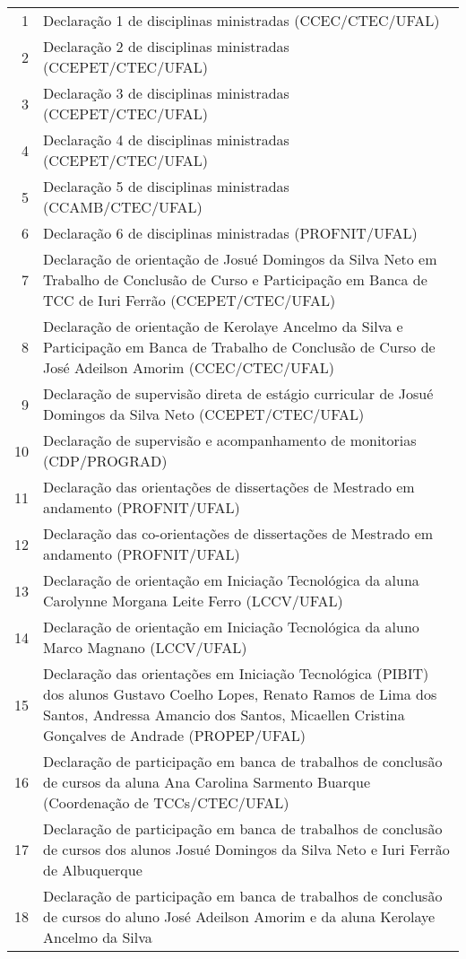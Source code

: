 \documentclass[a4paper,oneside,10pt]{article}
\begin{document}
{\begin{longtable}[H]{@{} r P{8cm} @{}}
1  & {Declaração 1 de disciplinas ministradas (CCEC/CTEC/UFAL)}\\
2  & {Declaração 2 de disciplinas ministradas (CCEPET/CTEC/UFAL)}\\
3  & {Declaração 3 de disciplinas ministradas (CCEPET/CTEC/UFAL)}\\
4  & {Declaração 4 de disciplinas ministradas (CCEPET/CTEC/UFAL)}\\
5  & {Declaração 5 de disciplinas ministradas (CCAMB/CTEC/UFAL)}\\
6  & {Declaração 6  de disciplinas ministradas (PROFNIT/UFAL)}\\
7  & {Declaração de orientação de Josué Domingos da Silva Neto em Trabalho de Conclusão de Curso e Participação em Banca de TCC de Iuri Ferrão (CCEPET/CTEC/UFAL)}\\
8  & {Declaração de orientação de Kerolaye Ancelmo da Silva e Participação em Banca de Trabalho de Conclusão de Curso de José Adeilson Amorim (CCEC/CTEC/UFAL)}\\
9  & {Declaração de supervisão direta de estágio curricular de Josué Domingos da Silva Neto (CCEPET/CTEC/UFAL)}\\
10 & {Declaração de supervisão e acompanhamento de monitorias (CDP/PROGRAD)}\\
11 & {Declaração das orientações de dissertações de Mestrado em andamento  (PROFNIT/UFAL)}\\
12 & {Declaração das co-orientações de dissertações de Mestrado em andamento (PROFNIT/UFAL)}\\
13 & {Declaração de orientação em Iniciação Tecnológica da aluna Carolynne Morgana Leite Ferro (LCCV/UFAL)}\\
14 & {Declaração de orientação em Iniciação Tecnológica da aluno Marco Magnano (LCCV/UFAL)}\\
15 & {Declaração das orientações em Iniciação Tecnológica (PIBIT) dos alunos Gustavo Coelho Lopes, Renato Ramos de Lima dos Santos, Andressa Amancio dos Santos, Micaellen Cristina Gonçalves de Andrade (PROPEP/UFAL)}\\
16 & {Declaração de participação em banca de trabalhos de conclusão de cursos da aluna Ana Carolina Sarmento Buarque (Coordenação de TCCs/CTEC/UFAL)}\\
17 & {Declaração de participação em banca de trabalhos de conclusão de cursos dos alunos Josué Domingos da Silva Neto e Iuri Ferrão de Albuquerque}\\
18 & {Declaração de participação em banca de trabalhos de conclusão de cursos do aluno José Adeilson Amorim e da aluna Kerolaye Ancelmo da Silva}\\

\end{longtable}}
\end{document}
